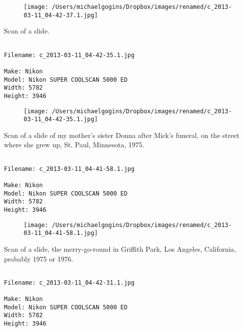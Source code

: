 \begin{figure}
\texttt{[image: /Users/michaelgogins/Dropbox/images/renamed/c\_2013-03-11\_04-42-37.1.jpg]}
\end{figure}
    
\clearpage
\onecolumn
\noindent Scan of a slide.
\noindent
\begin{lstlisting}

Filename: c_2013-03-11_04-42-35.1.jpg

Make: Nikon
Model: Nikon SUPER COOLSCAN 5000 ED
Width: 5782
Height: 3946
\end{lstlisting}
\clearpage

\begin{figure}
\texttt{[image: /Users/michaelgogins/Dropbox/images/renamed/c\_2013-03-11\_04-42-35.1.jpg]}
\end{figure}
    
\clearpage
\onecolumn
\noindent Scan of a slide of my mother's sister Donna after Mick's funeral, on the street where she grew up, St. Paul, Minnesota, 1975.
\noindent
\begin{lstlisting}

Filename: c_2013-03-11_04-41-58.1.jpg

Make: Nikon
Model: Nikon SUPER COOLSCAN 5000 ED
Width: 5782
Height: 3946
\end{lstlisting}
\clearpage

\begin{figure}
\texttt{[image: /Users/michaelgogins/Dropbox/images/renamed/c\_2013-03-11\_04-41-58.1.jpg]}
\end{figure}
    
\clearpage
\onecolumn
\noindent Scan of a slide, the merry-go-round in Griffith Park, Los Angeles, California, probably 1975 or 1976.
\noindent
\begin{lstlisting}

Filename: c_2013-03-11_04-42-31.1.jpg

Make: Nikon
Model: Nikon SUPER COOLSCAN 5000 ED
Width: 5782
Height: 3946
\end{lstlisting}
\clearpage

